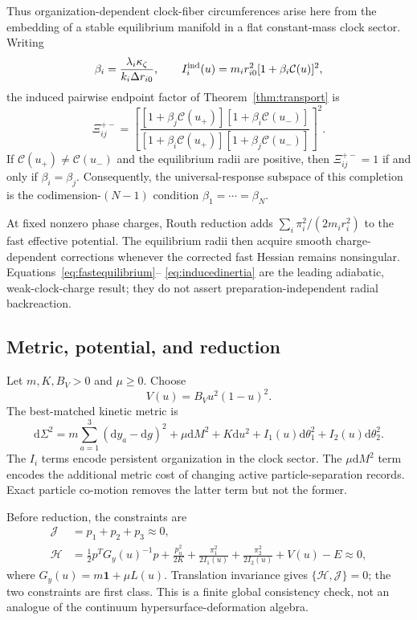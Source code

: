 \documentclass[11pt]{article}
\theoremstyle{plain}
\newcommand{\dd}{\mathrm d}
\begin{document}
Thus organization-dependent clock-fiber circumferences arise here from the
embedding of a stable equilibrium manifold in a flat constant-mass clock
sector.  Writing
\begin{equation}
 \beta_i=\frac{\lambda_i\kappa_\zeta}
 {k_i\Delta r_{i0}},
 \qquad
 I_i^{\rm ind}(u)=m_i r_{i0}^2
 [1+\beta_i\mathcal C(u)]^2,
 \label{eq:betai}
\end{equation}
the induced pairwise endpoint factor of
Theorem~\ref{thm:transport} is
\begin{equation}
 \Xi_{ij}^{+-}
 =\left[
 \frac{[1+\beta_j\mathcal C(u_+)]
       [1+\beta_i\mathcal C(u_-)]}
      {[1+\beta_i\mathcal C(u_+)]
       [1+\beta_j\mathcal C(u_-)]}
 \right]^2.
 \label{eq:inducedXi}
\end{equation}
If $\mathcal C(u_+)\ne\mathcal C(u_-)$ and the equilibrium radii are
positive, then $\Xi_{ij}^{+-}=1$ if and only if $\beta_i=\beta_j$.
Consequently, the universal-response subspace of this completion is the
codimension-$(N-1)$ condition
$\beta_1=\cdots=\beta_N$.

At fixed nonzero phase charges, Routh reduction adds
$\sum_i\pi_i^2/(2m_i r_i^2)$ to the fast effective potential.  The equilibrium
radii then acquire smooth charge-dependent corrections whenever the corrected
fast Hessian remains nonsingular.  Equations~\eqref{eq:fastequilibrium}--
\eqref{eq:inducedinertia} are the leading adiabatic, weak-clock-charge result;
they do not assert preparation-independent radial backreaction.

\subsection{Metric, potential, and reduction}

Let $m,K,B_V>0$ and $\mu\ge0$. Choose
\begin{equation}
V(u)=B_Vu^2(1-u)^2.
\end{equation}
The best-matched kinetic metric is
\begin{equation}
\dd\Sigma^2=m\sum_{a=1}^3(\dd y_a-\dd g)^2+\mu\dd M^2+K\dd u^2+I_1(u)\dd\theta_1^2+I_2(u)\dd\theta_2^2.
\end{equation}
The $I_i$ terms encode persistent organization in the clock sector. The $\mu\dd M^2$ term encodes the additional metric cost of changing active particle-separation records. Exact particle co-motion removes the latter term but not the former.

Before reduction, the constraints are
\begin{align}
\mathcal J&=p_1+p_2+p_3\approx0,\\
\mathcal H&=\frac12p^TG_y(u)^{-1}p+\frac{p_u^2}{2K}+\frac{\pi_1^2}{2I_1(u)}+\frac{\pi_2^2}{2I_2(u)}+V(u)-E\approx0,
\end{align}
where $G_y(u)=m\mathbf1+\mu L(u)$. Translation invariance gives $\{\mathcal H,\mathcal J\}=0$; the two constraints are first class. This is a finite global consistency check, not an analogue of the continuum hypersurface-deformation algebra.
\end{document}
